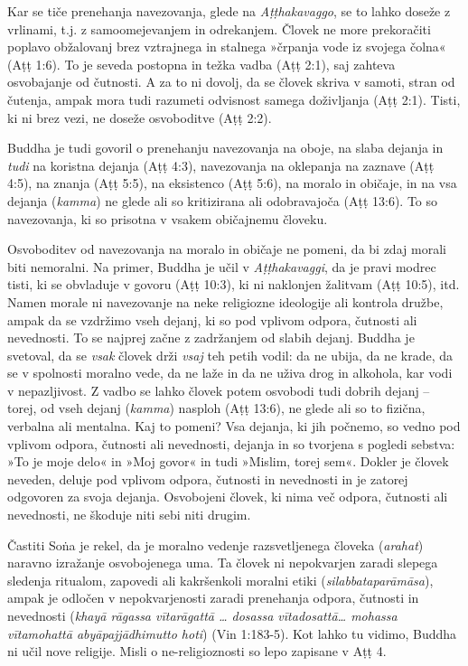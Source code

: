Kar se tiče prenehanja navezovanja, glede na \emph{Aṭṭhakavaggo}, se
to lahko doseže z vrlinami, t.j. z samoomejevanjem in odrekanjem. Človek
ne more prekoračiti poplavo obžalovanj brez vztrajnega in stalnega
»črpanja vode iz svojega čolna« (Aṭṭ 1:6). To je seveda postopna in
težka vadba (Aṭṭ 2:1), saj zahteva osvobajanje od čutnosti. A za to ni
dovolj, da se človek skriva v samoti, stran od čutenja, ampak mora tudi
razumeti odvisnost samega doživljanja (Aṭṭ 2:1). Tisti, ki ni brez vezi,
ne doseže osvoboditve (Aṭṭ 2:2).

Buddha je tudi govoril o prenehanju navezovanja na oboje, na slaba
dejanja in \emph{tudi} na koristna dejanja (Aṭṭ 4:3), navezovanja na
oklepanja na zaznave (Aṭṭ 4:5), na znanja (Aṭṭ 5:5), na eksistenco (Aṭṭ
5:6), na moralo in običaje, in na vsa dejanja (\emph{kamma}) ne glede
ali so kritizirana ali odobravajoča (Aṭṭ 13:6). To so navezovanja, ki so
prisotna v vsakem običajnemu človeku.

Osvoboditev od navezovanja na moralo in običaje ne pomeni, da bi zdaj
morali biti nemoralni. Na primer, Buddha je učil v \emph{Aṭṭhakavaggi},
da je pravi modrec tisti, ki se obvladuje v govoru (Aṭṭ 10:3), ki ni
naklonjen žalitvam (Aṭṭ 10:5), itd. Namen morale ni navezovanje na neke
religiozne ideologije ali kontrola družbe, ampak da se vzdržimo vseh
dejanj, ki so pod vplivom odpora, čutnosti ali nevednosti. To se najprej
začne z zadržanjem od slabih dejanj. Buddha je svetoval, da se
\emph{vsak} človek drži \emph{vsaj} teh petih vodil: da ne ubija, da ne
krade, da se v spolnosti moralno vede, da ne laže in da ne uživa drog in
alkohola, kar vodi v nepazljivost. Z vadbo se lahko človek potem
osvobodi tudi dobrih dejanj -- torej, od vseh dejanj (\emph{kamma})
nasploh (Aṭṭ 13:6), ne glede ali so to fizična, verbalna ali mentalna.
Kaj to pomeni? Vsa dejanja, ki jih počnemo, so vedno pod vplivom odpora,
čutnosti ali nevednosti, dejanja in so tvorjena s pogledi sebstva: »To
je moje delo« in »Moj govor« in tudi »Mislim, torej sem«. Dokler je
človek neveden, deluje pod vplivom odpora, čutnosti in nevednosti in je
zatorej odgovoren za svoja dejanja. Osvobojeni človek, ki nima več
odpora, čutnosti ali nevednosti, ne škoduje niti sebi niti drugim.

Častiti Soṅa je rekel, da je moralno vedenje razsvetljenega človeka
(\emph{arahat}) naravno izražanje osvobojenega uma. Ta človek ni
nepokvarjen zaradi slepega sledenja ritualom, zapovedi ali kakršenkoli
moralni etiki (\emph{silabbataparāmāsa}), ampak je odločen v
nepokvarjenosti zaradi prenehanja odpora, čutnosti in nevednosti
(\emph{khayā rāgassa vītarāgattā \ldots{} dosassa vītadosattā\ldots{}
mohassa vītamohattā abyāpajjādhimutto hoti}) (Vin 1:183-5). Kot lahko tu
vidimo, Buddha ni učil nove religije. Misli o ne-religioznosti so lepo
zapisane v Aṭṭ 4.

